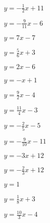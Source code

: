\begin{esercizio}\label{ese:}
 \begin{multicols}{3}
 \begin{enumeratea}
  \item  $y = -\frac{1}{2} x +11$
  \item  $y = -\frac{9}{11} x -6$
  \item  $y = 7 x -7$
 \end{enumeratea}
 \end{multicols}
\end{esercizio}

\begin{esercizio}\label{ese:}
 \begin{multicols}{3}
 \begin{enumeratea}
  \item  $y = \frac{5}{6} x +3$
  \item  $y = 2 x -6$
  \item  $y = - x +1$
 \end{enumeratea}
 \end{multicols}
\end{esercizio}

\begin{esercizio}\label{ese:}
 \begin{multicols}{3}
 \begin{enumeratea}
  \item  $y = \frac{9}{2} x -4$
  \item  $y = \frac{11}{4} x -3$
  \item  $y = -\frac{2}{5} x -5$
 \end{enumeratea}
 \end{multicols}
\end{esercizio}

\begin{esercizio}\label{ese:}
 \begin{multicols}{3}
 \begin{enumeratea}
  \item  $y = -\frac{9}{10} x -11$
  \item  $y = -3 x +12$
  \item  $y = -\frac{2}{3} x +12$
 \end{enumeratea}
 \end{multicols}
\end{esercizio}

\begin{esercizio}\label{ese:}
 \begin{multicols}{3}
 \begin{enumeratea}
  \item  $y = 1$
  \item  $y = \frac{1}{8} x +3$
  \item  $y = \frac{10}{3} x -4$
 \end{enumeratea}
 \end{multicols}
\end{esercizio}

